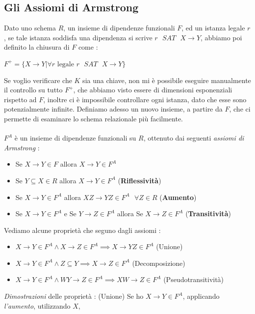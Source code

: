 \documentclass[12pt, letterpaper]{article}
\begin{document}
\subsection{Gli Assiomi di Armstrong}\label{armstrong}
Dato uno schema \(R\), un insieme di dipendenze funzionali \(F\), ed un istanza legale \(r\), se tale 
istanza soddisfa una dipendenza si scrive \(r \text{ }SAT \text{ } X\rightarrow Y\), abbiamo poi definito la chiusura 
di \(F\) come : \begin{center}
    \( F^+ = \{X\rightarrow Y | \forall r \text{ legale }r\text{ }SAT \text{ } X\rightarrow Y\}\)
\end{center}
Se voglio verificare che \(K\) sia una chiave, non mi è possibile eseguire manualmente il controllo su 
tutto \(F^+\), che abbiamo visto essere di dimensioni esponenziali rispetto ad \(F\), inoltre ci è impossibile 
controllare ogni istanza, dato che esse sono potenzialmente infinite. Definiamo adesso un nuovo insieme, a partire da 
\(F\), che ci permette di esaminare lo schema relazionale più facilmente. 
\\\hphantom{}\\
    \(F^A\) è un insieme di dipendenze funzionali su \(R\), ottenuto dai seguenti \textit{assiomi di Armstrong} :\begin{itemize}
        \item Se \(X\rightarrow Y \in F\) allora \(X\rightarrow Y \in F^A\)
        \item Se \(Y\subseteq X\in R\) allora \(X\rightarrow Y \in F^A\) (\textbf{Riflessività})
        \item Se \(X\rightarrow Y \in F^A\) allora \(XZ\rightarrow YZ \in F^A\text{ }\forall Z\in R\) (\textbf{Aumento})
        \item Se \(X\rightarrow Y \in F^A\) e Se \(Y\rightarrow Z \in F^A\) allora Se \(X\rightarrow Z \in F^A\) (\textbf{Transitività})
    \end{itemize} 
Vediamo alcune proprietà che seguno dagli assiomi :
\begin{itemize}
    \item \(X\rightarrow Y \in F^A\land X\rightarrow Z \in F^A \implies X\rightarrow YZ\in F^A\) (Unione)
    \item \(X\rightarrow Y \in F^A\land Z\subseteq Y \implies X\rightarrow Z \in F^A\) (Decomposizione)
    \item \(X\rightarrow Y \in F^A\land WY\rightarrow Z\in F^A \implies XW\rightarrow Z \in F^A\) (Pseudotransitività)
\end{itemize}
\textit{Dimostrazioni} delle proprietà : (Unione) Se ho \(X\rightarrow Y\in F^A\), applicando \textit{l'aumento}, utilizzando \(X\), 
\end{document}
